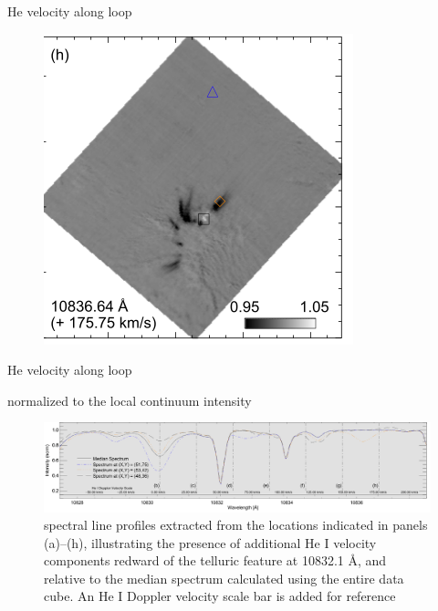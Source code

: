\documentclass{beamer}
\begin{document}
\begin{frame}{He velocity along loop}
 
\begin{figure}[H]
 \centering
 \includegraphics[scale=0.6]{sph.png}
\end{figure}

\end{frame}



\begin{frame}{He velocity along loop}

normalized to the local continuum intensity
 
\begin{figure}[H]
 \centering
 \includegraphics[scale=0.25]{sp_spec.png}
\caption{
spectral line profiles extracted from the
locations indicated in panels (a)–(h), illustrating the presence of additional He I velocity components redward of the telluric feature at 10832.1  \AA, and relative to the
median spectrum calculated using the entire data cube. An He I Doppler velocity scale bar is added for reference
}
\end{figure}



\end{frame}
\end{document}
